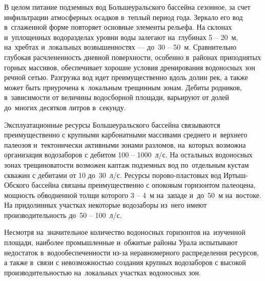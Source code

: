 В целом питание подземных вод Большеуральского бассейна сезонное, за счет инфильтрации атмосферных осадков в~теплый период года. Зеркало его вод в~сглаженной форме повторяет основные элементы рельефа. На склонах и~уплощенных водоразделах уровни воды залегают на~глубинах 5  --  20~м, на~хребтах и~локальных возвышенностях  ---  до~30  --  50~м. Сравнительно глубокая расчлененность дневной поверхности, особенно в~районах приподнятых горных массивов, обеспечивает хорошие условия дренирования водоносных зон речной сетью. Разгрузка вод идет преимущественно вдоль долин рек, а также может быть приурочена к~локальным трещинным зонам. Дебиты родников, в~зависимости от величины водосборной площади, варьируют от долей до~многих десятков литров в~секунду.

Эксплуатационные ресурсы Большеуральского бассейна связываются преимущественно с крупными карбонатными массивами среднего и~верхнего палеозоя и~тектонически активными зонами разломов, на~которых возможна организация водозаборов с дебитом 100  --  1000~л/с. На остальных водоносных зонах трещиноватости возможен каптаж подземных вод по~отдельным кустам скважин с дебитами от 10 до~30~л/с. Ресурсы порово-пластовых вод Иртыш-Обского бассейна связаны преимущественно с опоковым горизонтом палеоцена, мощность обводненной толщи которого 3  --  4~м на~западе и~до~50~м на~востоке. На придолинных участках некоторые водозаборы из~него имеют производительность до~50 -- 100~л/с.

Несмотря на~значительное количество водоносных горизонтов на~изученной площади, наиболее промышленные и~обжитые районы Урала испытывают недостаток в~водообеспеченности из-за неравномерного распределения ресурсов, а также в~связи с невозможностью создания крупных водозаборов с высокой производительностью на~локальных участках водоносных зон.
